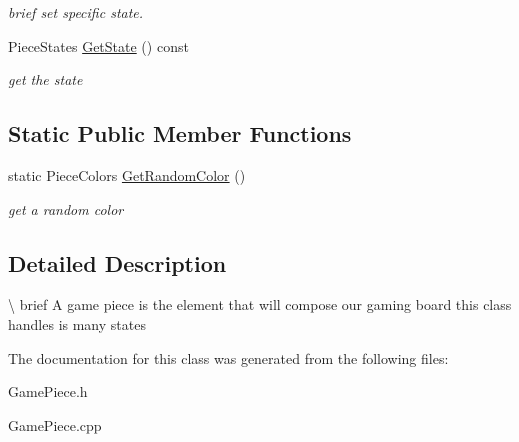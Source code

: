 \begin{DoxyCompactItemize}
\begin{DoxyCompactList}\small\item\em brief set specific state. \end{DoxyCompactList}\item 
\hypertarget{class_game_piece_ac2a9789ee9290279f9ed063140cced01}{Piece\-States \hyperlink{class_game_piece_ac2a9789ee9290279f9ed063140cced01}{Get\-State} () const }\label{class_game_piece_ac2a9789ee9290279f9ed063140cced01}

\begin{DoxyCompactList}\small\item\em get the state \end{DoxyCompactList}\end{DoxyCompactItemize}
\subsection*{Static Public Member Functions}
\begin{DoxyCompactItemize}
\item 
\hypertarget{class_game_piece_a5ff70f7f4511c0ed26323b36c3c720d1}{static Piece\-Colors \hyperlink{class_game_piece_a5ff70f7f4511c0ed26323b36c3c720d1}{Get\-Random\-Color} ()}\label{class_game_piece_a5ff70f7f4511c0ed26323b36c3c720d1}

\begin{DoxyCompactList}\small\item\em get a random color \end{DoxyCompactList}\end{DoxyCompactItemize}


\subsection{Detailed Description}
\textbackslash{} brief A game piece is the element that will compose our gaming board this class handles is many states 

The documentation for this class was generated from the following files\-:\begin{DoxyCompactItemize}
\item 
Game\-Piece.\-h\item 
Game\-Piece.\-cpp\end{DoxyCompactItemize}
